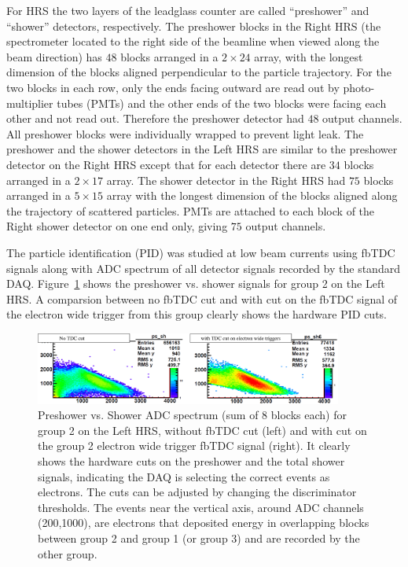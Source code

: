For HRS the two layers of the leadglass counter are 
called ``preshower'' and ``shower'' detectors, 
respectively. The preshower blocks in the Right HRS 
(the spectrometer located to the right 
side of the beamline when viewed along the beam direction) 
has $48$ blocks arranged in a $2\times 24$ 
array, with the longest dimension of the 
blocks aligned perpendicular to the particle trajectory. For the two blocks
in each row, only the ends facing outward are read 
out by photo-multiplier tubes (PMTs) and 
the other ends of the two blocks were facing each other 
and not read out. Therefore the 
preshower detector had $48$ output channels. All preshower 
blocks were individually wrapped 
to prevent light leak. The preshower and the shower detectors 
in the Left HRS are similar to 
the preshower detector on the Right HRS except that for each 
detector there are $34$ blocks 
arranged in a $2\times 17$ array. The shower detector in the 
Right HRS had $75$ blocks 
arranged in a $5\times 15$ array with the longest dimension 
of the blocks aligned along the trajectory of 
scattered particles. PMTs are attached to each block of 
the Right shower detector on one end only, 
giving $75$ output channels.

The particle identification (PID) was studied at 
low beam currents using 
fbTDC signals along with ADC spectrum
of all detector signals recorded by the standard DAQ. 
Figure~\ref{fig:showerspectrum} shows the preshower vs. shower
signals for group 2 on the Left HRS. A comparsion between no fbTDC cut and with 
cut on the fbTDC signal of the electron wide trigger from this group clearly shows the 
hardware PID cuts.
%
\begin{figure}[!ht]
\hspace*{0.8cm}
\includegraphics[width=0.9\textwidth]{RM/run_22060_group2_PSvsSH_edit.eps}
\hspace*{-0.2cm}
\caption{Preshower vs. Shower ADC spectrum (sum of 8 blocks each) for group 2 on the Left HRS,
without fbTDC cut (left) and with cut on the group 2 electron wide trigger fbTDC
signal (right). It clearly shows the hardware cuts on the preshower and the total
shower signals, indicating the DAQ is selecting the correct events
as electrons. The cuts can be adjusted by changing the discriminator 
thresholds.
The events near the vertical axis, around ADC channels (200,1000), 
are electrons that deposited energy in overlapping blocks between group 2 and group 1 
(or group 3) and are recorded by the other group.
}
\label{fig:showerspectrum}
\end{figure}


